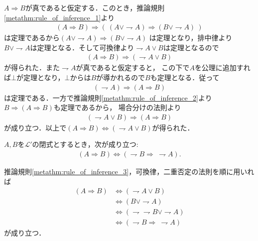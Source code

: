 	\begin{prf}
		$A \Longrightarrow B$が真であると仮定する．このとき，推論規則\ref{metathm:rule_of_inference_1}より
		\begin{align}
			(A \Longrightarrow B) \Longrightarrow 
			(\ (A \vee \rightharpoondown A) \Longrightarrow (B \vee \rightharpoondown A)\ )
		\end{align}
		は定理であるから$(A \vee \rightharpoondown A) \Longrightarrow (B \vee \rightharpoondown A)$
		は定理となり，排中律より$B \vee \rightharpoondown A$は定理となる．そして可換律より$\rightharpoondown A \vee B$は定理となるので
		\begin{align}
			(A \Longrightarrow B) \Longrightarrow (\rightharpoondown A \vee B)
		\end{align}
		が得られた．また$\rightharpoondown A$が真であると仮定すると，
		この下で$A$を公理に追加すれば$\bot$が定理となり，$\bot$からは$B$が導かれるので$B$も定理となる．従って
		\begin{align}
			(\rightharpoondown A) \Longrightarrow (A \Longrightarrow B)
		\end{align}
		は定理である．一方で推論規則\ref{metathm:rule_of_inference_2}より$B \Longrightarrow (A \Longrightarrow B)$も定理であるから，
		場合分けの法則より
		\begin{align}
			(\rightharpoondown A \vee B) \Longrightarrow (A \Longrightarrow B)
		\end{align}
		が成り立つ．以上で$(A \Longrightarrow B) \Longleftrightarrow (\rightharpoondown A \vee B)$が得られた．
		\QED
	\end{prf}
	
	\begin{screen}
		\begin{metathm}[対偶命題は同値]
			$A,B$を$\mathcal{L}'$の閉式とするとき，次が成り立つ:
			\begin{align}
				(A \Longrightarrow B) \Longleftrightarrow (\rightharpoondown B \Longrightarrow\ \rightharpoondown A).
			\end{align}
		\end{metathm}
	\end{screen}
	
	\begin{prf}
		推論規則\ref{metathm:rule_of_inference_3}，可換律，二重否定の法則を順に用いれば
		\begin{align}
			(A \Longrightarrow B) &\Longleftrightarrow (\rightharpoondown A \vee B) \\
			&\Longleftrightarrow (B \vee \rightharpoondown A) \\
			&\Longleftrightarrow (\rightharpoondown \rightharpoondown B \vee \rightharpoondown A) \\
			&\Longleftrightarrow (\rightharpoondown B \Longrightarrow\ \rightharpoondown A)
		\end{align}
		が成り立つ．
		\QED
	\end{prf}
	
